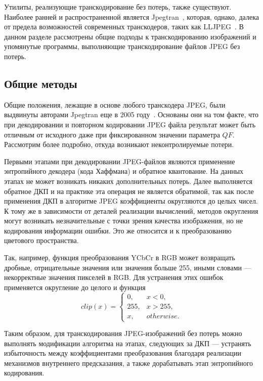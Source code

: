 \documentclass[times,specification,annotation]{itmo-student-thesis}
\begin{document}
Утилиты, реализующие транскодирование без потерь, также существуют. Наиболее ранней и распространенной является Jpegtran~\cite{jpegtran-description, jpegtran-project}, которая, однако, далека от предела возможностей современных транскодеров, таких как LLJPEG~\cite{lljpeg-overview, lljpeg-testing}. В данном разделе рассмотрены общие подходы к транскодированию изображений и упомянутые программы, выполняющие транскодирование файлов JPEG без потерь.

\subsection{Общие методы}\label{subsec:common-methods}

Общие положения, лежащие в основе любого транскодера JPEG, были выдвинуты авторами Jpegtran еще в 2005 году~\cite{jpegtran-description}. Основаны они на том факте, что при декодировании и повторном кодировании JPEG файла результат может быть отличным от исходного даже при фиксированном значении параметра $QF$. Рассмотрим более подробно, откуда возникают неконтролируемые потери.\par

Первыми этапами при декодировании JPEG-файлов являются применение энтропийного декодера (кода Хаффмана) и обратное квантование. На данных этапах не может возникать никаких дополнительных потерь. Далее выполняется обратное ДКП и на практике эта операция не является обратимой, так как после применения ДКП в алгоритме JPEG коэффициенты округляются до целых чисел. К тому же в зависимости от деталей реализации вычислений, методов округления могут возникать незначительные с точки зрения качества изображения, но не кодирования информации ошибки. Это же относится и к преобразованию цветового пространства.\par

Так, например, функция преобразования YCbCr в RGB может возвращать дробные, отрицательные значения или значения больше 255, иными словами --- некорректные значения пикселей в RGB. Для устранения этих ошибок применяется округление до целого и функция
\begin{equation*}
    clip(x)=\begin{cases}
        0,   & x < 0,     \\
        255, & x > 255,   \\
        x,   & otherwise.
    \end{cases}
\end{equation*}

Таким образом, для транскодирования JPEG-изображений без потерь можно выполнять модификации алгоритма на этапах, следующих за ДКП --- устранять избыточность между коэффициентами преобразования благодаря реализации механизмов внутреннего предсказания, а также дорабатывать этап энтропийного кодирования.
\end{document}
